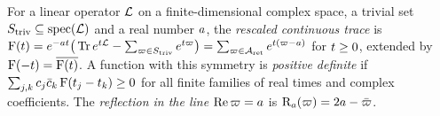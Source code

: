 \begin{definition}
\label{def:continuous-rescaled-trace}
For a linear operator $\mathcal L$ on a finite-dimensional complex space, a trivial set
$S_{\mathrm{triv}}\subseteq\operatorname{spec}(\mathcal L)$ and a real number $a$, the \emph{rescaled
continuous trace} is $\mathrm{F}(t) = e^{-at}\big(\operatorname{Tr} e^{t\mathcal L} -
\sum_{\varpi\in S_{\mathrm{triv}}}e^{t\varpi}\big) = \sum_{\varpi\in\mathcal A_{\mathrm{ret}}}e^{t(\varpi-a)}$ for
$t\ge0$, extended by $\mathrm{F}(-t) = \overline{\mathrm{F}(t)}$. A function with this
symmetry is \emph{positive definite} if $\sum_{j,k}c_j\bar c_k\,\mathrm{F}(t_j-t_k)\ge0$
for all finite families of real times and complex coefficients. The \emph{reflection in
the line} $\operatorname{Re}\varpi = a$ is $\mathrm{R}_{a}(\varpi) = 2a-\bar{\varpi}$.
\end{definition}
